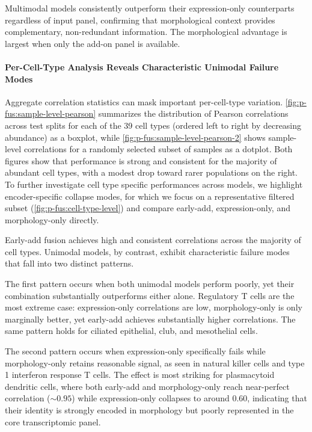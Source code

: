 Multimodal models consistently outperform their expression-only counterparts regardless of input panel, confirming that morphological context provides complementary, non-redundant information. The morphological advantage is largest when only the add-on panel is available.

\paragraph{Per-Cell-Type Analysis Reveals Characteristic Unimodal Failure Modes}
\label{sec:per-cell-type}

Aggregate correlation statistics can mask important per-cell-type variation. \autoref{fig:p-fus:sample-level-pearson} summarizes the distribution of Pearson correlations across test splits for each of the 39 cell types (ordered left to right by decreasing abundance) as a boxplot, while \autoref{fig:p-fus:sample-level-pearson-2} shows sample-level correlations for a randomly selected subset of samples as a dotplot. Both figures show that performance is strong and consistent for the majority of abundant cell types, with a modest drop toward rarer populations on the right. To further investigate cell type specific performances across models, we highlight encoder-specific collapse modes, for which we focus on a representative filtered subset (\autoref{fig:p-fus:cell-type-level}) and compare early-add, expression-only, and morphology-only directly.

Early-add fusion achieves high and consistent correlations across the majority of cell types. Unimodal models, by contrast, exhibit characteristic failure modes that fall into two distinct patterns.

The first pattern occurs when both unimodal models perform poorly, yet their combination substantially outperforms either alone. Regulatory T cells are the most extreme case: expression-only correlations are low, morphology-only is only marginally better, yet early-add achieves substantially higher correlations. The same pattern holds for ciliated epithelial, club, and mesothelial cells.

The second pattern occurs when expression-only specifically fails while morphology-only retains reasonable signal, as seen in natural killer cells and type 1 interferon response T cells. The effect is most striking for plasmacytoid dendritic cells, where both early-add and morphology-only reach near-perfect correlation (${\sim}0.95$) while expression-only collapses to around $0.60$, indicating that their identity is strongly encoded in morphology but poorly represented in the core transcriptomic panel.

